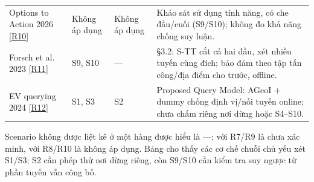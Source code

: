 \begin{longtable}{@{}P{3.387cm}P{1.742cm}P{2.613cm}P{8.614cm}@{}}
\addlinespace[3pt]
Options to Action 2026 [\href{https://elathan.github.io/papers/chi26.pdf}{R10}] & Không áp dụng & Không áp dụng & Khảo sát sử dụng tính năng, có che đầu/cuối (S9/S10); không đo khả năng chống suy luận.\\
\addlinespace[3pt]
Forsch et al. 2023 [\href{https://link.springer.com/chapter/10.1007/978-3-031-35374-1_3}{R11}] & S9, S10 & — & §3.2: S-TT cắt cả hai đầu, xét nhiều tuyến cùng đích; bảo đảm theo tập tấn công/địa điểm cho trước, offline.\\
\addlinespace[3pt]
EV querying 2024 [\href{https://wrap.warwick.ac.uk/id/eprint/183198/1/WRAP-privacy-preserving-querying-mechanism-high-utility-electric-vehicles-2024.pdf}{R12}] & S1, S3 & S2 & Proposed Query Model: AGeoI + dummy chống định vị/nối tuyến online; chưa chấm riêng nơi dừng hoặc S4–S10.\\
\end{longtable}
\endgroup
Scenario không được liệt kê ở một hàng được hiểu là —; với R7/R9 là chưa xác minh, với R8/R10 là không áp dụng. Bảng cho thấy các cơ chế chuỗi chủ yếu xét S1/S3; S2 cần phép thử nơi dừng riêng, còn S9/S10 cần kiểm tra suy ngược từ phần tuyến vẫn công bố.


